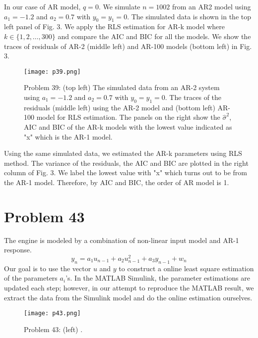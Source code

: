 \documentclass[a4paper, 11pt]{article}
\begin{document}
In our case of AR model, $q = 0$. We simulate $n = 1002$ from an AR2 model using $a_1 = -1.2$ and $a_2=0.7$ with $y_0 = y_1 = 0$. The simulated data is shown in the top left panel of Fig. 3. We apply the RLS estimation for AR-k model where $k \in \{1,2,\dots, 300 \}$ and compare the AIC and BIC for all the models. We show the traces of residuals of AR-2 (middle left) and AR-100 models (bottom left) in Fig. 3.  

\begin{figure}
	\begin{center}
		\texttt{[image: p39.png]}
		\caption{Problem 39: (top left) The simulated data from an AR-2 system using $a_1 = -1.2$ and $a_2=0.7$ with $y_0 = y_1 = 0$. The traces of the residuals (middle left) using the AR-2 model and (bottom left) AR-100 model for RLS estimation. The panels on the right show the $\hat{\sigma}^2$, AIC and BIC of the AR-k models with the lowest value indicated as "x" which is the AR-1 model. }
	\end{center}
\end{figure}

Using the same simulated data, we estimated the AR-k parameters using RLS method. The variance of the residuals, the AIC and BIC are plotted in the right column of Fig. 3. We label the lowest value with "x" which turns out to be from the AR-1 model. Therefore, by AIC and BIC, the order of AR model is 1. 



\section*{Problem 43}

The engine is modeled by a combination of non-linear input model and AR-1 response. 
\begin{equation}
y_n = a_1u_{n-1} + a_2u_{n-1}^2 + a_3y_{n-1} + w_n
\end{equation}
Our goal is to use the vector $u$ and $y$ to construct a online least square estimation of the parameters $a_i$'s. In the MATLAB Simulink, the parameter estimations are updated each step; however, in our attempt to reproduce the MATLAB result, we extract the data from the Simulink model and do the online estimation ourselves. 

\begin{figure}
	\begin{center}
		\texttt{[image: p43.png]}
		\caption{Problem 43: (left) . }
	\end{center}
\end{figure}
\end{document}
